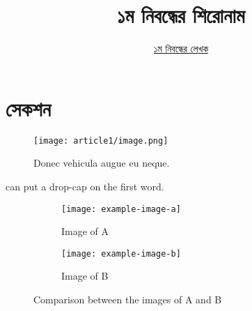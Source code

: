 \documentclass[12pt]{article}
\begin{document}

\title{১ম নিবন্ধের শিরোনাম}
\author{\href{https://github.com/rafisics/ebook-template}{১ম নিবন্ধের লেখক}}
\date{}


\section{সেকশন}

\begin{figure}[htbp]
        \centering
        \texttt{[image: article1/image.png]}
        \caption{Donec vehicula augue eu neque.}
\end{figure}

 can put a drop-cap on the first word.
\blindtext

\begin{figure}[htb]
    \centering
    \begin{subfigure}[t]{0.5\textwidth}
        \centering
        \texttt{[image: example-image-a]}
        \caption{Image of A}
    \end{subfigure}%
    \begin{subfigure}[t]{0.5\textwidth}
        \centering
        \texttt{[image: example-image-b]}
        \caption{Image of B}
    \end{subfigure}
    \caption{Comparison between the images of A and B}
\end{figure}

\end{document}
